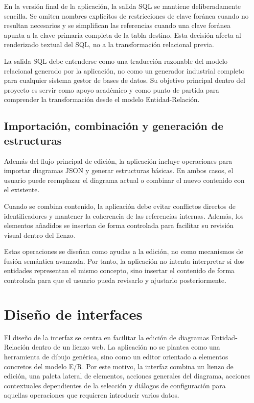 
En la versión final de la aplicación, la salida SQL se mantiene deliberadamente sencilla. Se omiten nombres explícitos de restricciones de clave foránea cuando no resultan necesarios y se simplifican las referencias cuando una clave foránea apunta a la clave primaria completa de la tabla destino. Esta decisión afecta al renderizado textual del SQL, no a la transformación relacional previa.

La salida SQL debe entenderse como una traducción razonable del modelo relacional generado por la aplicación, no como un generador industrial completo para cualquier sistema gestor de bases de datos. Su objetivo principal dentro del proyecto es servir como apoyo académico y como punto de partida para comprender la transformación desde el modelo Entidad-Relación.

\subsection{Importación, combinación y generación de estructuras}

Además del flujo principal de edición, la aplicación incluye operaciones para importar diagramas JSON y generar estructuras básicas. En ambos casos, el usuario puede reemplazar el diagrama actual o combinar el nuevo contenido con el existente.

Cuando se combina contenido, la aplicación debe evitar conflictos directos de identificadores y mantener la coherencia de las referencias internas. Además, los elementos añadidos se insertan de forma controlada para facilitar su revisión visual dentro del lienzo.

Estas operaciones se diseñan como ayudas a la edición, no como mecanismos de fusión semántica avanzada. Por tanto, la aplicación no intenta interpretar si dos entidades representan el mismo concepto, sino insertar el contenido de forma controlada para que el usuario pueda revisarlo y ajustarlo posteriormente.

\section{Diseño de interfaces}

El diseño de la interfaz se centra en facilitar la edición de diagramas Entidad-Relación dentro de un lienzo web. La aplicación no se plantea como una herramienta de dibujo genérica, sino como un editor orientado a elementos concretos del modelo E/R. Por este motivo, la interfaz combina un lienzo de edición, una paleta lateral de elementos, acciones generales del diagrama, acciones contextuales dependientes de la selección y diálogos de configuración para aquellas operaciones que requieren introducir varios datos.

